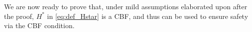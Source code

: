 \documentclass[10pt,conference]{ieeeconf}
\newcommand{\todo}[1]{\textcolor{red}{To Do: #1}}
\renewcommand{\(}{\left(}
\renewcommand{\)}{\right)}
\renewcommand{\[}{\left[}
\renewcommand{\]}{\right]}
\begin{document}
\begin{comment}
Finally, suppose $\boldsymbol{M}_1^*(t,x) \neq t$ and $\boldsymbol{R}(\boldsymbol{M}_1^*(t,x);t,x) \neq t$. This implies that $h(t,x) < 0$, so $x \in \textrm{int}(\mathcal{S}_H^*(t))$. In this case, $\boldsymbol{H}^*$ represents the future maximal value of $h$ along the path $p$ minus a strictly increasing function of the time until the next zero (or the next maximizer if $\boldsymbol{R}(\boldsymbol{M}_1^*(t,x);t,x) = \boldsymbol{M}^*(t,x)$) occurs. Then $\nabla H^*(t,x) g(t,x)$ describes the sensitivity of this maximal value and this future time to the current control input $u$. Let $p'(\tau;t,x)$ be an alternate path function, with corresponding times $\boldsymbol{M}_1'(t,x)$ and $\boldsymbol{R}'(\tau;t,x)$, and suppose that either $h(\boldsymbol{M}_1'(t,x),p'(\boldsymbol{M}_1^*(t,x);t,x)) < h(\boldsymbol{M}_1^*(t,x),p(\boldsymbol{M}_1^*(t,x);t,x))$ or $\boldsymbol{R}'(\boldsymbol{M}_1'(t,x);t,x) > \boldsymbol{R}(\boldsymbol{M}_1^*(t,x);t,x)$ or both (\todo{Figure}). Since $\| \nabla h^{(r-1)} g(t,x) \| > c$, such a path $p'$ is guaranteed to exist (e.g. see \cite[Sec. III-B]{CDC21}). 
\end{proof}
\end{comment}

We are now ready to prove that, under mild assumptions elaborated upon after the proof, $H^*$ in \eqref{eq:def_Hstar} is a CBF, and thus can be used to ensure safety via the CBF condition.
\end{document}
